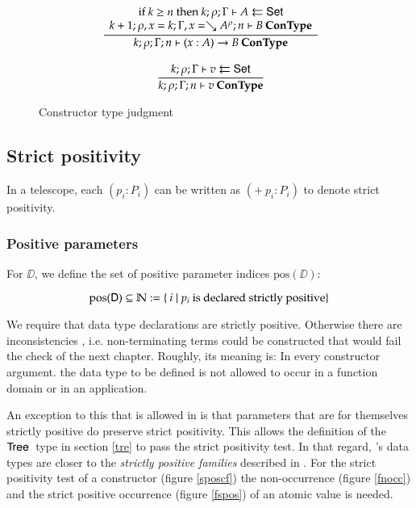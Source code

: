 \begin{figure}[htp]
\begin{gather*}
\ \dfrac{\begin{array}[b]{c}\mbox {if } k \geq n \mbox { then } k;\rho;\Gamma\vdash A\leftleftarrows\mathsf{Set}\\k+1;\rho,x=k;\Gamma,x=\searrow A^{\rho};n\vdash B\:\mathbf{ConType}\end{array}}{k;\rho;\Gamma;n\vdash( x : A ) \rightarrow{B}\:\mathbf{ConType}}
\\[2ex]
\ \dfrac{k;\rho;\Gamma\vdash v\leftleftarrows\mathsf{Set}}{k;\rho;\Gamma;n\vdash v\:\mathbf{ConType}}
\end{gather*}
\caption{Constructor type judgment}
\label{fcon}
\end{figure}

\subsection{Strict positivity}

\newcommand{\pos}{\mbox{pos}}

In a telescope, each $(p_i : P_i) $ can be written as $( + \: p_i : P_i) $ to denote strict positivity.

\subsubsection{Positive parameters}
For $\DD$, we define the set of positive parameter indices $\pos(\DD)$:

\[\pos(\DD) \subseteq \cN := \{ \: i \mid p_i \mbox{ is declared strictly positive} \}\]

We require that data type declarations are strictly positive.
Otherwise there are inconsistencies \cite{paulinmohring93inductive}, i.e. non-terminating terms could be constructed that would fail the check of the next chapter.
Roughly, its meaning is: In every constructor argument. the data type to be defined is not allowed to occur in a function domain or in an application.

An exception to this that is allowed in \mugda is that parameters that are for themselves strictly positive do preserve strict positivity. 
This allows the definition of the $\mathsf{Tree}\:$ type in section \ref{tre} to pass the strict positivity test. In that regard, \mugda 's data types are closer to the \emph{strictly positive families} described in \cite{alti:cats07}.
For the strict positivity test of a constructor (figure \ref{sposcf}) the non-occurrence (figure \ref{fnocc}) and the strict positive occurrence (figure \ref{fspos}) of an atomic value is needed.

\newcommand{\sposc}[3]{#1\vdash#2\mbox{ \textbf{sposc} }#3}
\newcommand{\spos}[3]{#1\vdash#2\mbox{ \textbf{spos} }#3}


